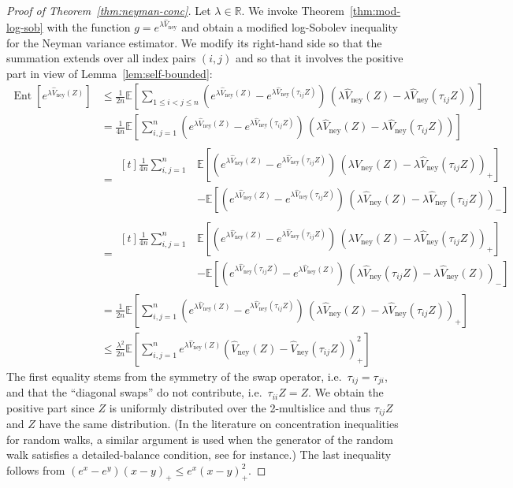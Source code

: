 \documentclass[aos]{imsart2}
\theoremstyle{plain}
\theoremstyle{definition}
\newcommand{\R}{\mathbb{R}}
\newcommand{\E}{\mathbb{E}}
\newcommand{\vhn}{\hat{V}_{\mathrm{ney}}}
\DeclareMathOperator{\ent}{Ent}
\begin{document}
\begin{appendix}
\begin{proof}[Proof of Theorem~\ref{thm:neyman-conc}] Let $\lambda \in \R$. We invoke Theorem~\ref{thm:mod-log-sob} with the function $g = e^{\lambda \vhn}$ and obtain a modified log-Sobolev inequality for the Neyman variance estimator. We modify its right-hand side so that the summation extends over all index pairs $(i,j)$ and so that it involves the positive part in view of Lemma~\ref{lem:self-bounded}:
    \begin{align*}
        \ent[e^{\lambda \vhn(Z)}] &\leq \frac{1}{2n}\E\left[\sum_{1\leq i<j\leq n} (e^{\lambda \vhn(Z)}-e^{\lambda \vhn(\tau_{ij}Z)})\,(\lambda\vhn(Z)-\lambda\vhn(\tau_{ij}Z))\right]\\
        &= \frac{1}{4n}\E\left[\sum_{i,j=1}^n (e^{\lambda \vhn(Z)}-e^{\lambda \vhn(\tau_{ij}Z)})\,(\lambda\vhn(Z)-\lambda\vhn(\tau_{ij}Z))\right]\\
        &=\begin{aligned}[t]
            \frac{1}{4n} \sum_{i,j=1}^n &\E\left[(e^{\lambda \vhn(Z)}-e^{\lambda \vhn(\tau_{ij}Z)})\,(\lambda\vhn(Z)-\lambda\vhn(\tau_{ij}Z))_+\right]\\
            &-\E\left[(e^{\lambda \vhn(Z)}-e^{\lambda \vhn(\tau_{ij}Z)})\,(\lambda\vhn(Z)-\lambda\vhn(\tau_{ij}Z))_-\right]
        \end{aligned}\\
        &=\begin{aligned}[t]
            \frac{1}{4n} \sum_{i,j=1}^n &\E\left[(e^{\lambda \vhn(Z)}-e^{\lambda \vhn(\tau_{ij}Z)})\,(\lambda\vhn(Z)-\lambda\vhn(\tau_{ij}Z))_+\right]\\
            &-\E\left[(e^{\lambda \vhn(\tau_{ij}Z)}-e^{\lambda \vhn(Z)})\,(\lambda\vhn(\tau_{ij}Z)-\lambda\vhn(Z))_-\right]
        \end{aligned}\\
        &= \frac{1}{2n}\E\left[\sum_{i,j=1}^n (e^{\lambda \vhn(Z)}-e^{\lambda \vhn(\tau_{ij}Z)})\,(\lambda\vhn(Z)-\lambda\vhn(\tau_{ij}Z))_+\right]\\
        &\leq \frac{\lambda^2}{2n}\E\left[\sum_{i,j=1}^n e^{\lambda \vhn(Z)}(\vhn(Z)-\vhn(\tau_{ij}Z))_+^2\right]
    \end{align*}
    The first equality stems from the symmetry of the swap operator, i.e.\ $\tau_{ij} = \tau_{ji}$, and that the ``diagonal swaps'' do not contribute, i.e.\ $\tau_{ii}Z=Z$. We obtain the positive part since $Z$ is uniformly distributed over the 2-multislice and thus $\tau_{ij} Z$ and $Z$ have the same distribution. (In the literature on concentration inequalities for random walks, a similar argument is used when the generator of the random walk satisfies a detailed-balance condition, see \cite{adamczak_concentration_2021} for instance.) The last inequality follows from $(e^x-e^y)(x-y)_+ \leq e^x(x-y)_+^2$.


\end{proof}
\end{appendix}
\end{document}
